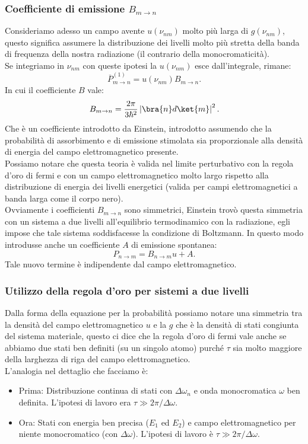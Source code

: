 \subsubsection{Coefficiente di emissione $B_{m\to n}$}%
Consideriamo adesso un campo avente $u(\nu_{nm})$ molto più larga di $g(\nu_{nm})$, questo significa assumere la distribuzione dei livelli molto più stretta della banda di frequenza della nostra radiazione (il contrario della monocromaticità).\\
Se integriamo in $\nu_{nm}$ con queste ipotesi la $u(\nu_{nm})$ esce dall'integrale, rimane:
\[
    \overline{P}^{(1)}_{m\to n} =
    u(\nu_{nm}) B_{m\to n}
.\]
In cui il coefficiente $B$ vale:
\[
B_{m\to n} =
\frac{2\pi}{3\hbar ^2}\left|\bra{n}d \ket{m}\right|^2
.\] 
Che è un coefficiente introdotto da Einstein, introdotto assumendo che la probabilità di assorbimento e di emissione stimolata sia proporzionale alla densità di energia del campo elettromagnetico presente. \\
Possiamo notare che questa teoria è valida nel limite perturbativo con la regola d'oro di fermi e con un campo elettromagnetico molto largo rispetto alla distribuzione di energia dei livelli energetici (valida per campi elettromagnetici a banda larga come il corpo nero).\\
Ovviamente i coefficienti $B_{m\to n}$ sono simmetrici, Einstein trovò questa simmetria con un sistema a due livelli all'equilibrio termodinamico con la radiazione, egli impose che tale sistema soddisfacesse la condizione di Boltzmann. In questo modo introdusse anche un coefficiente $A$ di emissione spontanea:
\[
P_{n\to m} = B_{n\to m} u + A
.\] 
Tale nuovo termine è indipendente dal campo elettromagnetico.\\
\subsubsection{Utilizzo della regola d'oro per sistemi a due livelli}%
Dalla forma della equazione per la probabilità possiamo notare una simmetria tra la densità del campo elettromagnetico $u$ e la $g$ che è la densità di stati congiunta del sistema materiale, questo ci dice che la regola d'oro di fermi vale anche se abbiamo due stati ben definiti (su un singolo atomo) purché $\tau$ sia molto maggiore della larghezza di riga del campo elettromagnetico.\\
L'analogia nel dettaglio che facciamo è:
\begin{itemize}
    \item Prima: Distribuzione continua di stati con $\Delta\omega_{n}$ e onda monocromatica $\omega$ ben definita. L'ipotesi di lavoro era $\tau  \gg 2\pi  /\Delta\omega$.
    \item Ora: Stati con energia ben precisa ($E_1$ ed $E_2$) e campo elettromagnetico per niente monocromatico (con $\Delta\omega$). L'ipotesi di lavoro è $\tau  \gg 2\pi  /\Delta\omega$.
\end{itemize}
